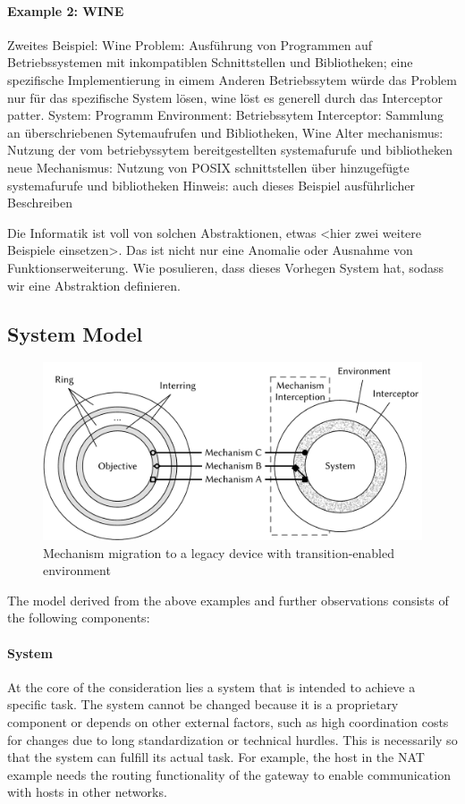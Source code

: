 \paragraph{Example 2: WINE}
Zweites Beispiel: Wine
Problem: Ausführung von Programmen auf Betriebssystemen mit inkompatiblen Schnittstellen und Bibliotheken; eine spezifische Implementierung in eimem Anderen Betriebssytem würde das Problem nur für das spezifische System lösen, wine löst es generell durch das Interceptor patter.
System: Programm
Environment: Betriebssytem
Interceptor: Sammlung an überschriebenen Sytemaufrufen und Bibliotheken, Wine
Alter mechanismus: Nutzung der vom betriebyssytem bereitgestellten systemafurufe und bibliotheken
neue Mechanismus: Nutzung von POSIX schnittstellen über hinzugefügte systemafurufe und bibliotheken
Hinweis: auch dieses Beispiel ausführlicher Beschreiben

Die Informatik ist voll von solchen Abstraktionen, etwas <hier zwei weitere Beispiele einsetzen>.
Das ist nicht nur eine Anomalie oder Ausnahme von Funktionserweiterung.
Wie posulieren, dass dieses Vorhegen System hat, sodass wir eine Abstraktion definieren.


\subsection{System Model}
\begin{figure}
    \centering
    \includegraphics[width=\linewidth]{figures/MechanismMigration.pdf}
    \caption{Mechanism migration to a legacy device with transition-enabled environment}
    \label{fig:bigpicture}
\end{figure}

The model derived from the above examples and further observations consists of the following components:


\paragraph{System}
At the core of the consideration lies a system that is intended to achieve a specific task.
The system cannot be changed because it is a proprietary component or depends on other external factors, such as high coordination costs for changes due to long standardization or technical hurdles.
This is necessarily so that the system can fulfill its actual task. 
For example, the host in the NAT example needs the routing functionality of the gateway to enable communication with hosts in other networks.

